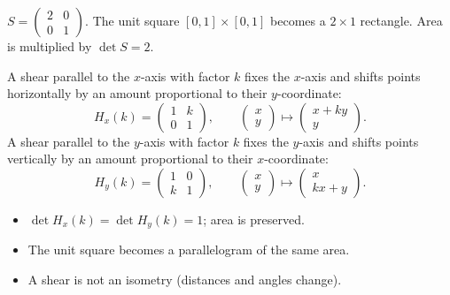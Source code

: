 \documentclass[11pt]{article}
\newcommand{\cle}[1]{{\popxbold\color{popdark}#1}}
\newcounter{popsec}
\newcounter{popsub}
\newcommand{\courssub}[1]{%
  \stepcounter{popsub}%
  \par\vspace{9pt}\noindent{\popxbold\fontsize{11.5}{13}\selectfont\color{popink}{\color{poporange}\thepopsec.\thepopsub}\hspace{6pt}#1}\par\nopagebreak\vspace{4pt}
}
\begin{document}
\begin{exemplebox}[Stretch with $a=2$, $b=1$]
$S = \begin{pmatrix} 2 & 0 \\ 0 & 1 \end{pmatrix}$. The unit square $[0,1]\times[0,1]$ becomes a $2\times1$ rectangle. Area is multiplied by $\det S = 2$.
\end{exemplebox}

\courssub{Shears}

A \cle{shear} parallel to the $x$-axis with factor $k$ fixes the $x$-axis and shifts points horizontally by an amount proportional to their $y$-coordinate:
\[
H_x(k) = \begin{pmatrix} 1 & k \\ 0 & 1 \end{pmatrix},\qquad
\begin{pmatrix} x \\ y \end{pmatrix} \mapsto \begin{pmatrix} x + ky \\ y \end{pmatrix}.
\]
A shear parallel to the $y$-axis with factor $k$ fixes the $y$-axis and shifts points vertically by an amount proportional to their $x$-coordinate:
\[
H_y(k) = \begin{pmatrix} 1 & 0 \\ k & 1 \end{pmatrix},\qquad
\begin{pmatrix} x \\ y \end{pmatrix} \mapsto \begin{pmatrix} x \\ kx + y \end{pmatrix}.
\]

\begin{propriete}
\begin{itemize}
\item $\det H_x(k) = \det H_y(k) = 1$; area is preserved.
\item The unit square becomes a parallelogram of the same area.
\item A shear is not an isometry (distances and angles change).
\end{itemize}
\end{propriete}
\end{document}
